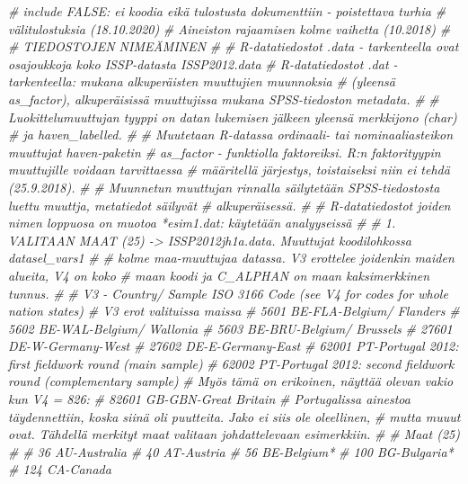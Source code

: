 \documentclass[
  finnish,
]{book}
\newenvironment{Shaded}{\begin{snugshade}}{\end{snugshade}}
\newcommand{\CommentTok}[1]{\textcolor[rgb]{0.56,0.35,0.01}{\textit{#1}}}
\begin{document}
\begin{Shaded}
\begin{Highlighting}[]
\CommentTok{# include FALSE: ei koodia eikä tulostusta dokumenttiin - poistettava turhia}
\CommentTok{# välitulostuksia (18.10.2020)}
\CommentTok{# Aineiston rajaamisen kolme vaihetta (10.2018)}
\CommentTok{# }
\CommentTok{# TIEDOSTOJEN NIMEÄMINEN}
\CommentTok{#}
\CommentTok{# R-datatiedostot .data - tarkenteella ovat osajoukkoja koko ISSP-datasta ISSP2012.data}
\CommentTok{# R-datatiedostot .dat - tarkenteella: mukana alkuperäisten muuttujien muunnoksia }
\CommentTok{# (yleensä as_factor), alkuperäisissä muuttujissa mukana SPSS-tiedoston metadata.}
\CommentTok{#}
\CommentTok{# Luokittelumuuttujan tyyppi on datan lukemisen jälkeen yleensä merkkijono (char) }
\CommentTok{# ja haven_labelled. }
\CommentTok{#}
\CommentTok{# Muutetaan R-datassa ordinaali- tai  nominaaliasteikon muuttujat haven-paketin }
\CommentTok{# as_factor - funktiolla faktoreiksi. R:n faktorityypin muuttujille voidaan tarvittaessa }
\CommentTok{# määritellä järjestys, toistaiseksi niin ei tehdä (25.9.2018). }
\CommentTok{#}
\CommentTok{# Muunnetun muuttujan rinnalla säilytetään SPSS-tiedostosta luettu muuttja, metatiedot säilyvät }
\CommentTok{# alkuperäisessä.}
\CommentTok{#       }
\CommentTok{# R-datatiedostot joiden nimen loppuosa on muotoa *esim1.dat: käytetään analyyseissä}
\CommentTok{#}
\CommentTok{# 1. VALITAAN MAAT (25) -> ISSP2012jh1a.data. Muuttujat koodilohkossa datasel_vars1}
\CommentTok{#}
\CommentTok{# kolme maa-muuttujaa datassa. V3 erottelee joidenkin maiden alueita, V4 on koko }
\CommentTok{# maan koodi ja C_ALPHAN on maan kaksimerkkinen tunnus.}
\CommentTok{#}
\CommentTok{# V3 - Country/ Sample ISO 3166 Code (see V4 for codes for whole nation states)}
\CommentTok{# V3 erot valituissa maissa}
\CommentTok{# 5601 BE-FLA-Belgium/ Flanders}
\CommentTok{# 5602 BE-WAL-Belgium/ Wallonia}
\CommentTok{# 5603 BE-BRU-Belgium/ Brussels}
\CommentTok{# 27601 DE-W-Germany-West}
\CommentTok{# 27602 DE-E-Germany-East}
\CommentTok{# 62001 PT-Portugal 2012: first fieldwork round (main sample)}
\CommentTok{# 62002 PT-Portugal 2012: second fieldwork round (complementary sample)}
\CommentTok{# Myös tämä on erikoinen, näyttää olevan vakio kun V4 = 826:}
\CommentTok{# 82601 GB-GBN-Great Britain}
\CommentTok{# Portugalissa ainestoa täydennettiin, koska siinä oli puutteita. Jako ei siis ole oleellinen,}
\CommentTok{# mutta muuut ovat. Tähdellä merkityt maat valitaan johdattelevaan esimerkkiin.}
\CommentTok{#}
\CommentTok{# Maat (25)}
\CommentTok{#}
\CommentTok{# 36 AU-Australia}
\CommentTok{# 40 AT-Austria}
\CommentTok{# 56 BE-Belgium*}
\CommentTok{# 100 BG-Bulgaria*}
\CommentTok{# 124 CA-Canada}

\end{Highlighting}
\end{Shaded}
\end{document}
